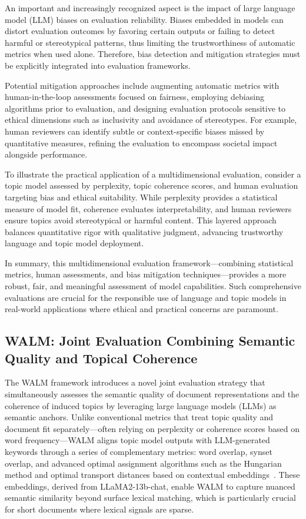\documentclass[sigconf]{acmart}
\begin{document}
An important and increasingly recognized aspect is the impact of large language model (LLM) biases on evaluation reliability. Biases embedded in models can distort evaluation outcomes by favoring certain outputs or failing to detect harmful or stereotypical patterns, thus limiting the trustworthiness of automatic metrics when used alone. Therefore, bias detection and mitigation strategies must be explicitly integrated into evaluation frameworks.

Potential mitigation approaches include augmenting automatic metrics with human-in-the-loop assessments focused on fairness, employing debiasing algorithms prior to evaluation, and designing evaluation protocols sensitive to ethical dimensions such as inclusivity and avoidance of stereotypes. For example, human reviewers can identify subtle or context-specific biases missed by quantitative measures, refining the evaluation to encompass societal impact alongside performance.

To illustrate the practical application of a multidimensional evaluation, consider a topic model assessed by perplexity, topic coherence scores, and human evaluation targeting bias and ethical suitability. While perplexity provides a statistical measure of model fit, coherence evaluates interpretability, and human reviewers ensure topics avoid stereotypical or harmful content. This layered approach balances quantitative rigor with qualitative judgment, advancing trustworthy language and topic model deployment.

In summary, this multidimensional evaluation framework—combining statistical metrics, human assessments, and bias mitigation techniques—provides a more robust, fair, and meaningful assessment of model capabilities. Such comprehensive evaluations are crucial for the responsible use of language and topic models in real-world applications where ethical and practical concerns are paramount.

\subsection{WALM: Joint Evaluation Combining Semantic Quality and Topical Coherence}

The WALM framework introduces a novel joint evaluation strategy that simultaneously assesses the semantic quality of document representations and the coherence of induced topics by leveraging large language models (LLMs) as semantic anchors. Unlike conventional metrics that treat topic quality and document fit separately—often relying on perplexity or coherence scores based on word frequency—WALM aligns topic model outputs with LLM-generated keywords through a series of complementary metrics: word overlap, synset overlap, and advanced optimal assignment algorithms such as the Hungarian method and optimal transport distances based on contextual embeddings~\cite{ref47}. These embeddings, derived from LLaMA2-13b-chat, enable WALM to capture nuanced semantic similarity beyond surface lexical matching, which is particularly crucial for short documents where lexical signals are sparse.
\end{document}
